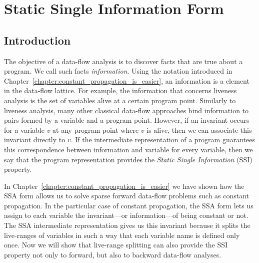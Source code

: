 \chapter{Static Single Information Form }
\label{chapter:ssi}

{
\def\progpoint{program point\xspace}
\def\progpoints{program points\xspace}
\def\splitpoint{control-flow point\xspace}
\def\splitpoints{control-flow points\xspace}
\def\psplit{\emph{Split}\xspace}
\def\pinfo{\emph{Info}\xspace}
\def\plink{\emph{Link}\xspace}
\def\pversion{\emph{Version}\xspace}

\section{Introduction}
\label{sec:ssi:pereira:intro}

The objective of a data-flow analysis is to discover facts that are true about a
program.
We call such facts {\em information}.
Using the notation introduced in 
Chapter~\ref{chapter:constant_propagation_is_easier}, an
information is a element in the data-flow lattice.
For example, the information that concerns liveness analysis is the set of
variables alive at a certain \progpoint.
Similarly to liveness analysis, many other classical data-flow approaches bind
information to pairs formed by a variable and a \progpoint.
However, if an invariant occurs for a variable $v$ at any \progpoint where
$v$ is alive, then we can associate this invariant directly to $v$.
If the intermediate representation of a program guarantees this correspondence 
between
information and variable for every variable, then we say that the program
representation provides the {\em Static Single Information} (SSI) property.

In Chapter~\ref{chapter:constant_propagation_is_easier} we have shown how the 
SSA form allows us to solve sparse forward data-flow problems such as constant 
propagation.
In the particular case of constant propagation, the SSA form lets us assign to 
each variable the invariant---or information---of being constant or not.
The SSA intermediate representation gives us this invariant because it splits 
the live-ranges of variables in such a way that each variable name is defined 
only once.
Now we will show that live-range splitting can also provide the SSI property not only to forward, but also to backward data-flow analyses.

}
